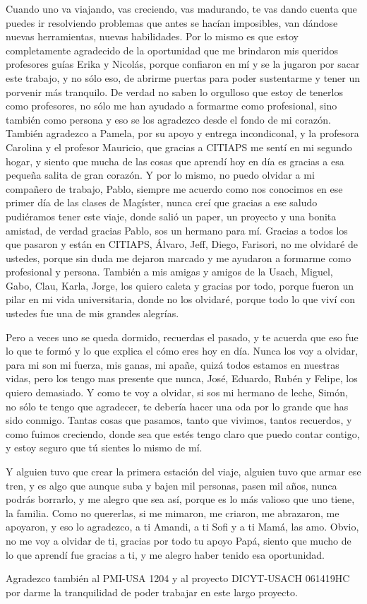 \begin{agradecimiento}
{Cuando uno va viajando, vas creciendo, vas madurando, te vas dando cuenta que puedes ir resolviendo problemas que antes se hacían imposibles, van dándose nuevas herramientas, nuevas habilidades. Por lo mismo es que estoy completamente agradecido de la oportunidad que me brindaron mis queridos profesores guías Erika y Nicolás, porque confiaron en mí y se la jugaron por sacar este trabajo, y no sólo eso, de abrirme puertas para poder sustentarme y tener un porvenir más tranquilo. De verdad no saben lo orgulloso que estoy de tenerlos como profesores, no sólo me han ayudado a formarme como profesional, sino también como persona y eso se los agradezco desde el fondo de mi corazón. También agradezco a Pamela, por su apoyo y entrega incondiconal, y la profesora Carolina y el profesor Mauricio, que gracias a CITIAPS me sentí en mi segundo hogar, y siento que mucha de las cosas que aprendí hoy en día es gracias a esa pequeña salita de gran corazón. Y por lo mismo, no puedo olvidar a mi compañero de trabajo, Pablo, siempre me acuerdo como nos conocimos en ese primer día de las clases de Magíster, nunca creí que gracias a ese saludo pudiéramos tener este viaje, donde salió un paper, un proyecto y una bonita amistad, de verdad gracias Pablo, sos un hermano para mí. Gracias a todos los que pasaron y están en CITIAPS, Álvaro, Jeff, Diego, Farisori, no me olvidaré de ustedes, porque sin duda me dejaron marcado y me ayudaron a formarme como profesional y persona. También a mis amigas y amigos de la Usach, Miguel, Gabo, Clau, Karla, Jorge, los quiero caleta y gracias por todo, porque fueron un pilar en mi vida universitaria, donde no los olvidaré, porque todo lo que viví con ustedes fue una de mis grandes alegrías.

Pero a veces uno se queda dormido, recuerdas el pasado, y te acuerda que eso fue lo que te formó y lo que explica el cómo eres hoy en día. Nunca los voy a olvidar, para mi son mi fuerza, mis ganas, mi apañe, quizá todos estamos en nuestras vidas, pero los tengo mas presente que nunca, José, Eduardo, Rubén y Felipe, los quiero demasiado. Y como te voy a olvidar, si sos mi hermano de leche, Simón, no sólo te tengo que agradecer, te debería hacer una oda por lo grande que has sido conmigo. Tantas cosas que pasamos, tanto que vivimos, tantos recuerdos, y como fuimos creciendo, donde sea que estés tengo claro que puedo contar contigo, y estoy seguro que tú sientes lo mismo de mí.

Y alguien tuvo que crear la primera estación del viaje, alguien tuvo que armar ese tren, y es algo que aunque suba y bajen mil personas, pasen mil años, nunca podrás borrarlo, y me alegro que sea así, porque es lo más valioso que uno tiene, la familia. Como no quererlas, si me mimaron, me criaron, me abrazaron, me apoyaron, y eso lo agradezco, a ti Amandi, a ti Sofi y a ti Mamá, las amo. Obvio, no me voy a olvidar de ti, gracias por todo tu apoyo Papá, siento que mucho de lo que aprendí fue gracias a ti, y me alegro haber tenido esa oportunidad.

Agradezco también al PMI-USA 1204 y al proyecto DICYT-USACH 061419HC por darme la tranquilidad de poder trabajar en este largo proyecto.}
\end{agradecimiento}